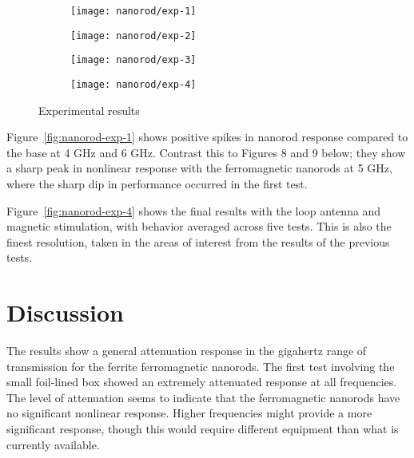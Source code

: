 \begin{figure}[h!]
    \centering
    \begin{subfigure}{0.45\textwidth}
        \centering
        \texttt{[image: nanorod/exp-1]}
        \caption[]{}
        \label{nanorod-exp-1}
    \end{subfigure}
        \begin{subfigure}{0.45\textwidth}
        \centering
        \texttt{[image: nanorod/exp-2]}
        \caption[]{}
        \label{nanorod-exp-2}
    \end{subfigure}
        \begin{subfigure}{0.45\textwidth}
        \centering
        \texttt{[image: nanorod/exp-3]}
        \caption[]{}
        \label{nanorod-exp-3}
    \end{subfigure}
        \begin{subfigure}{0.45\textwidth}
        \centering
        \texttt{[image: nanorod/exp-4]}
        \caption[]{}
        \label{nanorod-exp-4}
    \end{subfigure}
    \caption[Ferromagnetic nanorod experimental results]{Experimental results}
    \label{fig:nanorod-results}
\end{figure}

Figure~\ref{fig:nanorod-exp-1} shows positive spikes in nanorod response compared to the base at 4 GHz and 6 GHz. Contrast this to Figures 8 and 9 below; they show a sharp peak in nonlinear response with the ferromagnetic nanorods at 5 GHz, where the sharp dip in performance occurred in the first test.

Figure~\ref{fig:nanorod-exp-4} shows the final results with the loop antenna and magnetic stimulation, with behavior averaged across five tests. This is also the finest resolution, taken in the areas of interest from the results of the previous tests.

\section{Discussion}
\label{sec:nanorod-discussion}


The results show a general attenuation response in the gigahertz range of transmission for the ferrite ferromagnetic nanorods. The first test involving the small foil-lined box showed an extremely attenuated response at all frequencies. The level of attenuation seems to indicate that the ferromagnetic nanorods have no significant nonlinear response. Higher frequencies might provide a more significant response, though this would require different equipment than what is currently available.

